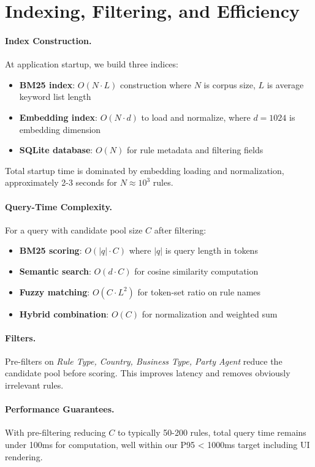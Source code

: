 \section{Indexing, Filtering, and Efficiency}
\paragraph{Index Construction.} At application startup, we build three indices:
\begin{itemize}[leftmargin=*,itemsep=2pt,topsep=2pt]
 \item \textbf{BM25 index}: $O(N \cdot L)$ construction where $N$ is corpus size, $L$ is average keyword list length
 \item \textbf{Embedding index}: $O(N \cdot d)$ to load and normalize, where $d = 1024$ is embedding dimension
 \item \textbf{SQLite database}: $O(N)$ for rule metadata and filtering fields
\end{itemize}
Total startup time is dominated by embedding loading and normalization, approximately 2-3 seconds for $N \approx 10^3$ rules.

\paragraph{Query-Time Complexity.} For a query with candidate pool size $C$ after filtering:
\begin{itemize}[leftmargin=*,itemsep=2pt,topsep=2pt]
 \item \textbf{BM25 scoring}: $O(|q| \cdot C)$ where $|q|$ is query length in tokens
 \item \textbf{Semantic search}: $O(d \cdot C)$ for cosine similarity computation
 \item \textbf{Fuzzy matching}: $O(C \cdot L^2)$ for token-set ratio on rule names
 \item \textbf{Hybrid combination}: $O(C)$ for normalization and weighted sum
\end{itemize}

\paragraph{Filters.} Pre-filters on \emph{Rule Type, Country, Business Type, Party Agent} reduce the candidate pool before scoring. This improves latency and removes obviously irrelevant rules.

\paragraph{Performance Guarantees.} With pre-filtering reducing $C$ to typically 50-200 rules, total query time remains under 100ms for computation, well within our P95 < 1000ms target including UI rendering.

